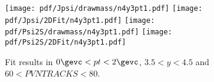 \begin{figure}[H]
\begin{center}
\texttt{[image: pdf/Jpsi/drawmass/n4y3pt1.pdf]}
\texttt{[image: pdf/Jpsi/2DFit/n4y3pt1.pdf]}
\vspace*{-0.5cm}
\texttt{[image: pdf/Psi2S/drawmass/n4y3pt1.pdf]}
\texttt{[image: pdf/Psi2S/2DFit/n4y3pt1.pdf]}
\vspace*{-0.5cm}
\end{center}
\caption{Fit results in $0\gevc<pt<2\gevc$, $3.5<y<4.5$ and $60<PVNTRACKS<80$.}
\label{Fitn4y3pt1}
\end{figure}
